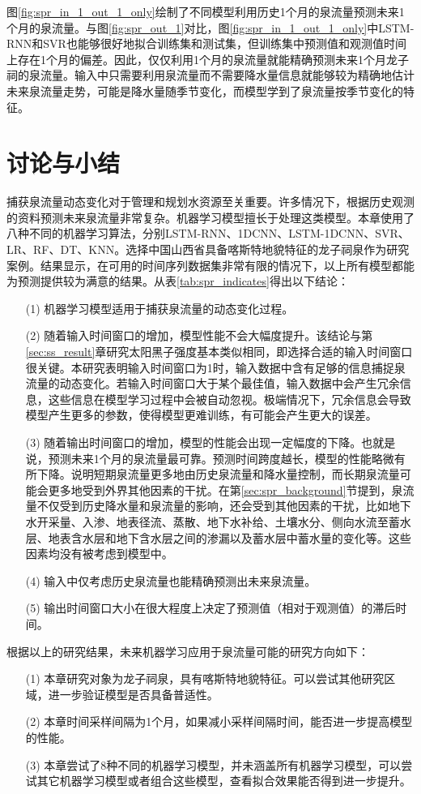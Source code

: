 图\ref{fig:spr_in_1_out_1_only}绘制了不同模型利用历史1个月的泉流量预测未来1个月的泉流量。与图\ref{fig:spr_out_1}对比，图\ref{fig:spr_in_1_out_1_only}中LSTM-RNN和SVR也能够很好地拟合训练集和测试集，但训练集中预测值和观测值时间上存在1个月的偏差。因此，仅仅利用1个月的泉流量就能精确预测未来1个月龙子祠的泉流量。输入中只需要利用泉流量而不需要降水量信息就能够较为精确地估计未来泉流量走势，可能是降水量随季节变化，而模型学到了泉流量按季节变化的特征。

\section{讨论与小结}\label{sec:spr_conclusion}

捕获泉流量动态变化对于管理和规划水资源至关重要。许多情况下，根据历史观测的资料预测未来泉流量非常复杂。机器学习模型擅长于处理这类模型。本章使用了八种不同的机器学习算法，分别LSTM-RNN、1DCNN、LSTM-1DCNN、SVR、LR、RF、DT、KNN。选择中国山西省具备喀斯特地貌特征的龙子祠泉作为研究案例。结果显示，在可用的时间序列数据集非常有限的情况下，以上所有模型都能为预测提供较为满意的结果。从表\ref{tab:spr_indicates}得出以下结论：
\begin{enumerate}
  \item[(1)] 机器学习模型适用于捕获泉流量的动态变化过程。
  \item[(2)] 随着输入时间窗口的增加，模型性能不会大幅度提升。该结论与第\ref{sec:ss_result}章研究太阳黑子强度基本类似相同，即选择合适的输入时间窗口很关键。本研究表明输入时间窗口为1时，输入数据中含有足够的信息捕捉泉流量的动态变化。若输入时间窗口大于某个最佳值，输入数据中会产生冗余信息，这些信息在模型学习过程中会被自动忽视。极端情况下，冗余信息会导致模型产生更多的参数，使得模型更难训练，有可能会产生更大的误差。
  \item[(3)] 随着输出时间窗口的增加，模型的性能会出现一定幅度的下降。也就是说，预测未来1个月的泉流量最可靠。预测时间跨度越长，模型的性能略微有所下降。说明短期泉流量更多地由历史泉流量和降水量控制，而长期泉流量可能会更多地受到外界其他因素的干扰。在第\ref{sec:spr_background}节提到，泉流量不仅受到历史降水量和泉流量的影响，还会受到其他因素的干扰，比如地下水开采量、入渗、地表径流、蒸散、地下水补给、土壤水分、侧向水流至蓄水层、地表含水层和地下含水层之间的渗漏以及蓄水层中蓄水量的变化等。这些因素均没有被考虑到模型中。
  \item[(4)] 输入中仅考虑历史泉流量也能精确预测出未来泉流量。
  \item[(5)] 输出时间窗口大小在很大程度上决定了预测值（相对于观测值）的滞后时间。
\end{enumerate}

根据以上的研究结果，未来机器学习应用于泉流量可能的研究方向如下：
\begin{enumerate}
  \item[(1)] 本章研究对象为龙子祠泉，具有喀斯特地貌特征。可以尝试其他研究区域，进一步验证模型是否具备普适性。
  \item[(2)] 本章时间采样间隔为1个月，如果减小采样间隔时间，能否进一步提高模型的性能。
  \item[(3)] 本章尝试了8种不同的机器学习模型，并未涵盖所有机器学习模型，可以尝试其它机器学习模型或者组合这些模型，查看拟合效果能否得到进一步提升。
\end{enumerate}




